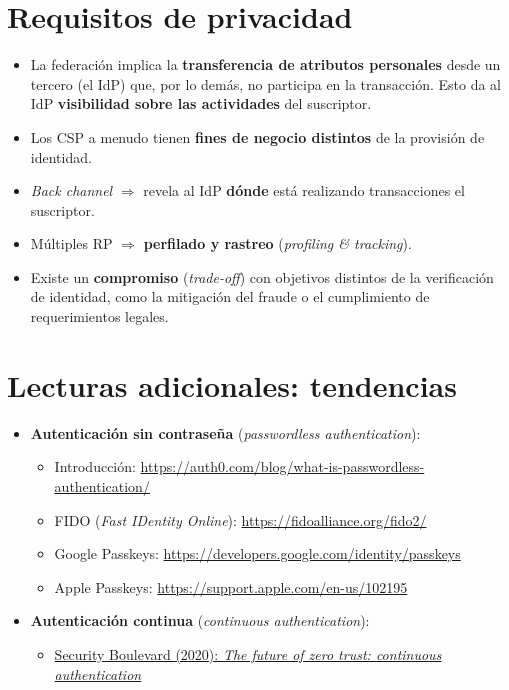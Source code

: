 \documentclass[11pt,a4paper]{report}
\begin{document}
\section{Requisitos de privacidad}
 
\begin{itemize}
  \item La federación implica la \textbf{transferencia de atributos personales} desde un tercero (el IdP) que, por lo demás, no participa en la transacción. Esto da al IdP \textbf{visibilidad sobre las actividades} del suscriptor.
  \item Los CSP a menudo tienen \textbf{fines de negocio distintos} de la provisión de identidad.
  \item \emph{Back channel} $\Rightarrow$ revela al IdP \textbf{dónde} está realizando transacciones el suscriptor.
  \item Múltiples RP $\Rightarrow$ \textbf{perfilado y rastreo} (\emph{profiling \& tracking}).
  \item Existe un \textbf{compromiso} (\emph{trade-off}) con objetivos distintos de la verificación de identidad, como la mitigación del fraude o el cumplimiento de requerimientos legales.
\end{itemize}
 
\section{Lecturas adicionales: tendencias}
 
\begin{itemize}
  \item \textbf{Autenticación sin contraseña} (\emph{passwordless authentication}):
    \begin{itemize}
      \item Introducción: \url{https://auth0.com/blog/what-is-passwordless-authentication/}
      \item FIDO (\emph{Fast IDentity Online}): \url{https://fidoalliance.org/fido2/}
      \item Google Passkeys: \url{https://developers.google.com/identity/passkeys}
      \item Apple Passkeys: \url{https://support.apple.com/en-us/102195}
    \end{itemize}
  \item \textbf{Autenticación continua} (\emph{continuous authentication}):
    \begin{itemize}
      \item \href{https://securityboulevard.com/2020/07/the-future-of-zero-trust-continuous-authentication/}{Security Boulevard (2020): \emph{The future of zero trust: continuous authentication}}
    \end{itemize}
\end{itemize}
\end{document}
